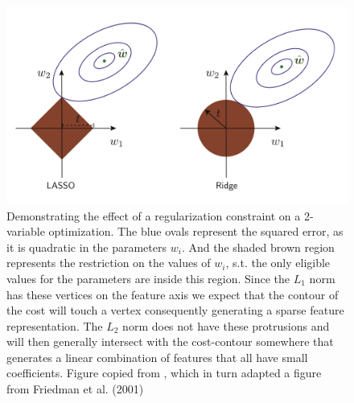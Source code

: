 \begin{figure}
\centering
\includegraphics[width=\textwidth]{../figures/regularization}
\caption[Geometric interpretation of the $L_1$ and $L_2$ regularization and the squared error cost]{Demonstrating the effect of a regularization constraint on a 2-variable optimization. The blue ovals represent the squared error, as it is quadratic in the parameters $w_i$. And the shaded brown region represents the restriction on the values of $w_i$, s.t. the only eligible values for the parameters are inside this region. Since the $L_1$ norm has these vertices on the feature axis we expect that the contour of the cost will touch a vertex consequently generating a sparse feature representation. The $L_2$ norm does not have these protrusions and will then generally intersect with the cost-contour somewhere that generates a linear combination of features that all have small coefficients. Figure copied from \citet{Mehta2019}, which in turn adapted a figure from Friedman et al. (2001)}\label{fig:regularization}
\end{figure}